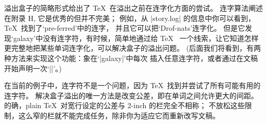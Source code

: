 溢出盒子的简略形式给出了 \TeX\ 在溢出之前在连字化方面的尝试。%
连字算法阐述在附录 H, 它是优秀的但并不完美；
例如，从 |story.log| 的信息中你可以看到，\TeX\ 找到了`pre-ferred'中的连字，
并且它可以把`Drof-nats'连字化。%
但是它发现`galaxy'中没有连字符，有时候，简单地通过给 \TeX\ %
一个线索，让它知道怎样更完整地把某些单词连字化，可以解决盒子的溢出问题。%
(后面我们将看到，有两种方法来实现这个功能：象在`\hbox{|gal\-axy|}'中每次%
插入任意连字符，或者通过在文稿开始声明一次`\hbox{||}'。)

在当前的例子中，连字符不是一个问题，因为 \TeX\ 找到并尝试了所有可能有用的%
连字符。%
解决盒子溢出的唯一方法是改变公差，即在单词之间允许更大的间距。%
的确，plain \TeX\ 对宽行设定的公差与 2-inch 的栏完全不相称；
不放松这些限制，这么窄的栏就不能完成任务，除非你为适应它而重新改写文稿。

